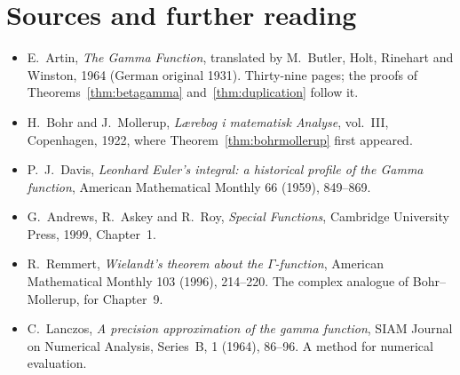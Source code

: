 \section*{Sources and further reading}

\begin{itemize}
\item E.~Artin, \emph{The Gamma Function}, translated by M.~Butler, Holt, Rinehart and Winston, 1964 (German original 1931).
Thirty-nine pages; the proofs of Theorems~\ref{thm:betagamma} and~\ref{thm:duplication} follow it.
\item H.~Bohr and J.~Mollerup, \emph{L\ae{}rebog i matematisk Analyse}, vol.~III, Copenhagen, 1922, where
Theorem~\ref{thm:bohrmollerup} first appeared.
\item P.~J.~Davis, \emph{Leonhard Euler's integral: a historical profile of the Gamma function}, American Mathematical Monthly
66 (1959), 849--869.
\item G.~Andrews, R.~Askey and R.~Roy, \emph{Special Functions}, Cambridge University Press, 1999, Chapter~1.
\item R.~Remmert, \emph{Wielandt's theorem about the $\Gamma$-function}, American Mathematical Monthly 103 (1996), 214--220. The
complex analogue of Bohr--Mollerup, for Chapter~9.
\item C.~Lanczos, \emph{A precision approximation of the gamma function}, SIAM Journal on Numerical Analysis, Series~B, 1
(1964), 86--96. A method for numerical evaluation.
\end{itemize}

